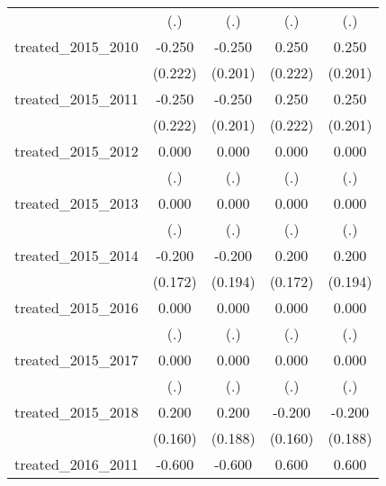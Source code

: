 {\begin{tabular}{l*{4}{c}}
            &         (.)         &         (.)         &         (.)         &         (.)         \\
[1em]
treated\_2015\_2010&      -0.250         &      -0.250         &       0.250         &       0.250         \\
            &     (0.222)         &     (0.201)         &     (0.222)         &     (0.201)         \\
[1em]
treated\_2015\_2011&      -0.250         &      -0.250         &       0.250         &       0.250         \\
            &     (0.222)         &     (0.201)         &     (0.222)         &     (0.201)         \\
[1em]
treated\_2015\_2012&       0.000         &       0.000         &       0.000         &       0.000         \\
            &         (.)         &         (.)         &         (.)         &         (.)         \\
[1em]
treated\_2015\_2013&       0.000         &       0.000         &       0.000         &       0.000         \\
            &         (.)         &         (.)         &         (.)         &         (.)         \\
[1em]
treated\_2015\_2014&      -0.200         &      -0.200         &       0.200         &       0.200         \\
            &     (0.172)         &     (0.194)         &     (0.172)         &     (0.194)         \\
[1em]
treated\_2015\_2016&       0.000         &       0.000         &       0.000         &       0.000         \\
            &         (.)         &         (.)         &         (.)         &         (.)         \\
[1em]
treated\_2015\_2017&       0.000         &       0.000         &       0.000         &       0.000         \\
            &         (.)         &         (.)         &         (.)         &         (.)         \\
[1em]
treated\_2015\_2018&       0.200         &       0.200         &      -0.200         &      -0.200         \\
            &     (0.160)         &     (0.188)         &     (0.160)         &     (0.188)         \\
[1em]
treated\_2016\_2011&      -0.600\sym{**} &      -0.600\sym{**} &       0.600\sym{**} &       0.600\sym{**} \\

\end{tabular}}
